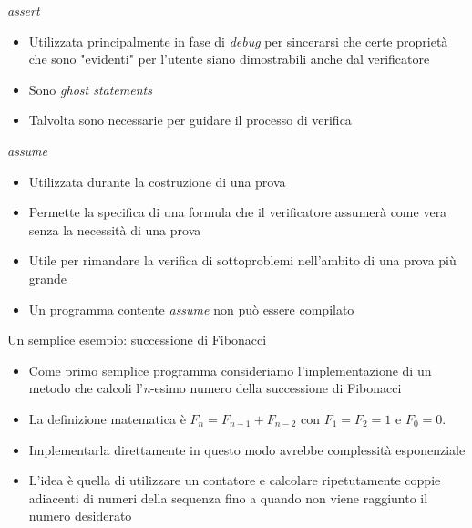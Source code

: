 \documentclass[]{beamer}
\begin{document}
\begin{frame}{\textit{assert}}
\begin{itemize}
    \item Utilizzata principalmente in fase di \textit{debug} per sincerarsi che certe proprietà che sono "evidenti" per l'utente siano dimostrabili anche dal verificatore
    \item Sono \textit{ghost statements}
    \item Talvolta sono necessarie per guidare il processo di verifica
\end{itemize}    
\end{frame}

\begin{frame}{\textit{assume}}
    \begin{itemize}
        \item Utilizzata durante la costruzione di una prova
        \item Permette la specifica di una formula che il verificatore assumerà come vera senza la necessità di una prova
        \item Utile per rimandare la verifica di sottoproblemi nell'ambito di una prova più grande
        \item Un programma contente \textit{assume} non può essere compilato
    \end{itemize}
\end{frame}

\begin{frame}{Un semplice esempio: successione di Fibonacci}
    \begin{itemize}
        \item Come primo semplice programma consideriamo l'implementazione di un metodo che calcoli l'\textit{n}-esimo numero della successione di Fibonacci
        \item La definizione matematica è $F_n = F_{n-1} + F_{n-2}$ con $F_1 = F_2 = 1$ e $F_0 = 0$. 
        \item Implementarla direttamente in questo modo avrebbe complessità esponenziale
        \item L'idea è quella di utilizzare un contatore e calcolare ripetutamente coppie adiacenti di numeri della sequenza fino a quando non viene raggiunto il numero desiderato
    \end{itemize}
\end{frame}
\end{document}
